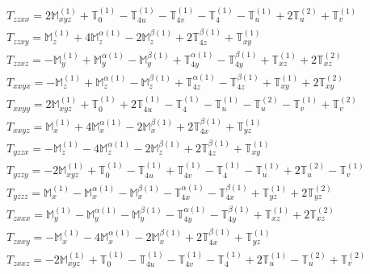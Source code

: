 \documentclass[fleqn,8pt,landscape]{jsarticle}
\begin{document}
\begin{align*}
& T_{zzxx} = 2 \mathbb{M}_{xyz}^{(1)} + \mathbb{T}_{0}^{(1)} - \mathbb{T}_{4u}^{(1)} - \mathbb{T}_{4v}^{(1)} - \mathbb{T}_{4}^{(1)} - \mathbb{T}_{u}^{(1)} + 2 \mathbb{T}_{u}^{(2)} + \mathbb{T}_{v}^{(1)} \\
& T_{zzxy} = \mathbb{M}_{z}^{(1)} + 4 \mathbb{M}_{z}^{\alpha(1)} - 2 \mathbb{M}_{z}^{\beta(1)} + 2 \mathbb{T}_{4z}^{\beta(1)} + \mathbb{T}_{xy}^{(1)} \\
& T_{zzxz} = - \mathbb{M}_{y}^{(1)} + \mathbb{M}_{y}^{\alpha(1)} - \mathbb{M}_{y}^{\beta(1)} + \mathbb{T}_{4y}^{\alpha(1)} - \mathbb{T}_{4y}^{\beta(1)} + \mathbb{T}_{xz}^{(1)} + 2 \mathbb{T}_{xz}^{(2)} \\
& T_{xxyx} = - \mathbb{M}_{z}^{(1)} + \mathbb{M}_{z}^{\alpha(1)} - \mathbb{M}_{z}^{\beta(1)} + \mathbb{T}_{4z}^{\alpha(1)} - \mathbb{T}_{4z}^{\beta(1)} + \mathbb{T}_{xy}^{(1)} + 2 \mathbb{T}_{xy}^{(2)} \\
& T_{xxyy} = 2 \mathbb{M}_{xyz}^{(1)} + \mathbb{T}_{0}^{(1)} + 2 \mathbb{T}_{4u}^{(1)} - \mathbb{T}_{4}^{(1)} - \mathbb{T}_{u}^{(1)} - \mathbb{T}_{u}^{(2)} - \mathbb{T}_{v}^{(1)} + \mathbb{T}_{v}^{(2)} \\
& T_{xxyz} = \mathbb{M}_{x}^{(1)} + 4 \mathbb{M}_{x}^{\alpha(1)} - 2 \mathbb{M}_{x}^{\beta(1)} + 2 \mathbb{T}_{4x}^{\beta(1)} + \mathbb{T}_{yz}^{(1)} \\
& T_{yzzx} = - \mathbb{M}_{z}^{(1)} - 4 \mathbb{M}_{z}^{\alpha(1)} - 2 \mathbb{M}_{z}^{\beta(1)} + 2 \mathbb{T}_{4z}^{\beta(1)} + \mathbb{T}_{xy}^{(1)} \\
& T_{yzzy} = - 2 \mathbb{M}_{xyz}^{(1)} + \mathbb{T}_{0}^{(1)} - \mathbb{T}_{4u}^{(1)} + \mathbb{T}_{4v}^{(1)} - \mathbb{T}_{4}^{(1)} - \mathbb{T}_{u}^{(1)} + 2 \mathbb{T}_{u}^{(2)} - \mathbb{T}_{v}^{(1)} \\
& T_{yzzz} = \mathbb{M}_{x}^{(1)} - \mathbb{M}_{x}^{\alpha(1)} - \mathbb{M}_{x}^{\beta(1)} - \mathbb{T}_{4x}^{\alpha(1)} - \mathbb{T}_{4x}^{\beta(1)} + \mathbb{T}_{yz}^{(1)} + 2 \mathbb{T}_{yz}^{(2)} \\
& T_{zxxx} = \mathbb{M}_{y}^{(1)} - \mathbb{M}_{y}^{\alpha(1)} - \mathbb{M}_{y}^{\beta(1)} - \mathbb{T}_{4y}^{\alpha(1)} - \mathbb{T}_{4y}^{\beta(1)} + \mathbb{T}_{xz}^{(1)} + 2 \mathbb{T}_{xz}^{(2)} \\
& T_{zxxy} = - \mathbb{M}_{x}^{(1)} - 4 \mathbb{M}_{x}^{\alpha(1)} - 2 \mathbb{M}_{x}^{\beta(1)} + 2 \mathbb{T}_{4x}^{\beta(1)} + \mathbb{T}_{yz}^{(1)} \\
& T_{zxxz} = - 2 \mathbb{M}_{xyz}^{(1)} + \mathbb{T}_{0}^{(1)} - \mathbb{T}_{4u}^{(1)} - \mathbb{T}_{4v}^{(1)} - \mathbb{T}_{4}^{(1)} + 2 \mathbb{T}_{u}^{(1)} - \mathbb{T}_{u}^{(2)} + \mathbb{T}_{v}^{(2)} \\

\end{align*}
\end{document}
